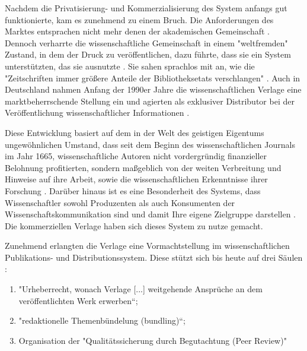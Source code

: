 Nachdem die Privatisierung- und Kommerzialisierung des System anfangs gut funktionierte, kam es zunehmend zu einem Bruch. Die Anforderungen des Marktes entsprachen nicht mehr denen der akademischen Gemeinschaft \cite{epaa_Weiner_2001}. Dennoch verharrte die wissenschaftliche Gemeinschaft in einem "weltfremden" Zustand, in dem der Druck zu veröffentlichen, dazu führte, dass sie ein System unterstützten, das sie ausnutzte \cite{epaa_Weiner_2001}. Sie sahen sprachlos mit an, wie die "Zeitschriften immer größere Anteile der Bibliotheksetats verschlangen" \cite{hagner_2015_sache_buches}. Auch in Deutschland nahmen Anfang der 1990er Jahre die wissenschaftlichen Verlage eine marktbeherrschende Stellung ein und agierten als exklusiver Distributor bei der Veröffentlichung wissenschaftlicher Informationen \cite{schloegl_2005} \cite{offhaus_2012_institutionelle_repos}.

Diese Entwicklung basiert auf dem in der Welt des geistigen Eigentums ungewöhnlichen Umstand, dass seit dem Beginn des wissenschaftlichen Journals im Jahr 1665, wissenschaftliche Autoren nicht vordergründig finanzieller Belohnung profitierten, sondern maßgeblich von der weiten Verbreitung und Hinweise auf ihre Arbeit, sowie die wissenschaftlichen Erkenntnisse ihrer Forschung \cite{albert_2006_open_implications}. Darüber hinaus ist es eine Besonderheit des Systems, dass Wissenschaftler sowohl Produzenten als auch Konsumenten der Wissenschaftskommunikation sind und damit Ihre eigene Zielgruppe darstellen \cite{Hess_2006}. Die kommerziellen Verlage haben sich dieses System zu nutze gemacht.

Zunehmend erlangten die Verlage eine Vormachtstellung im wissenschaftlichen Publikations- und Distributionssystem. Diese stützt sich bis heute auf drei Säulen \cite{offhaus_2012_institutionelle_repos} \cite{bargheer_2006_open}:
\begin{enumerate}
\item "Urheberrecht, wonach Verlage [...] weitgehende Ansprüche an dem veröffentlichten Werk erwerben“;
\item "redaktionelle Themenbündelung (bundling)“;
\item Organisation der "Qualitätssicherung durch Begutachtung (Peer Review)"
\end{enumerate}

